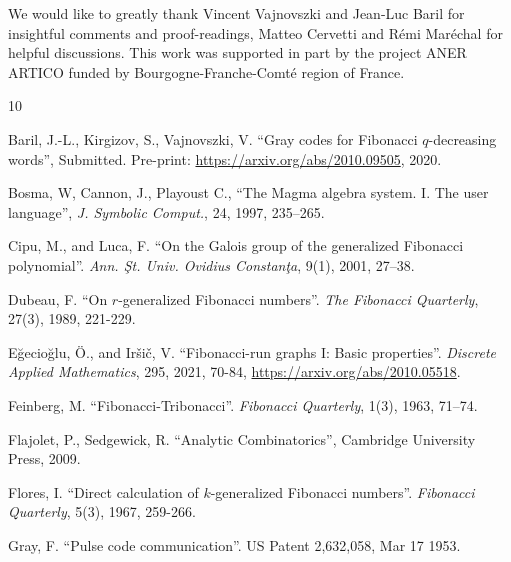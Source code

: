 \documentclass[a4paper,12pt]{article}
\theoremstyle{definition}
\begin{document}
We would like to greatly thank Vincent Vajnovszki and Jean-Luc Baril
for insightful comments and proof-readings, Matteo Cervetti and Rémi
Maréchal for helpful discussions.  This work was supported in part by
the project ANER ARTICO funded by Bourgogne-Franche-Comté region of
France.

\begin{thebibliography}{10}


  Baril, {\relax J.-L}., Kirgizov, S., Vajnovszki,  V.
  ``Gray codes for {F}ibonacci $q$-decreasing words'',
  Submitted. Pre-print:
  \url{https://arxiv.org/abs/2010.09505}, 2020.

  Bosma, W, Cannon, J., Playoust C.,
  ``The Magma algebra system. I. The user language'',
  {\em J. Symbolic Comput.}, 24, 1997, 235–265. 
  

  Cipu, M., and Luca, F.
  ``On the Galois group of the generalized Fibonacci polynomial''.
  {\em Ann. Şt. Univ. Ovidius Constanţa}, 9(1), 2001, 27–38.
  
  Dubeau, F.
  ``On $r$-generalized Fibonacci numbers''.
  {\em The Fibonacci Quarterly}, 27(3), 1989, 221-229.

  Eğecioğlu, \"O., and Iršič, V.
  ``Fibonacci-run graphs {I}: Basic properties''.
  {\em Discrete Applied Mathematics}, 295, 2021, 70-84,
  \url{https://arxiv.org/abs/2010.05518}.

  Feinberg, M.
  ``Fibonacci-Tribonacci''.
  {\em Fibonacci Quarterly}, 1(3), 1963, 71–74.

  Flajolet, P.,  Sedgewick, R.
  ``Analytic Combinatorics'',
  Cambridge University Press, 2009.
    
   Flores, I.
   ``Direct calculation of $k$-generalized Fibonacci numbers''.
   {\em Fibonacci Quarterly}, 5(3), 1967, 259-266.

   Gray, F.
   ``Pulse code communication''.
   US Patent 2,632,058, Mar 17 1953.


\end{thebibliography}
\end{document}

